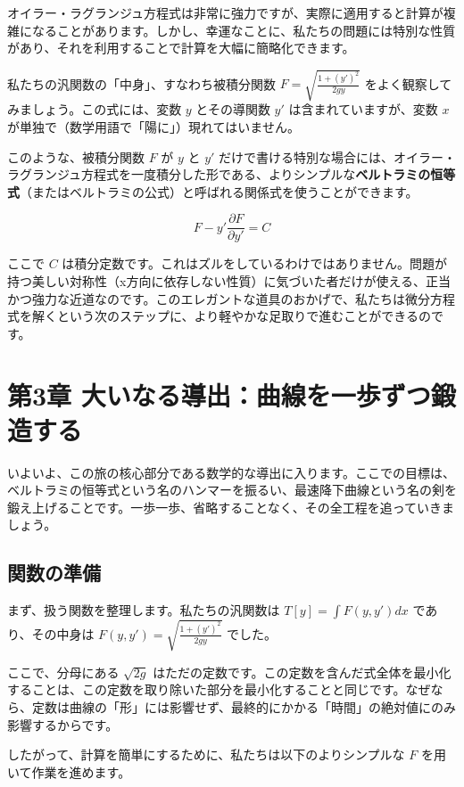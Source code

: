 \documentclass[12pt,a4paper]{ltjsarticle}
\begin{document}
オイラー・ラグランジュ方程式は非常に強力ですが、実際に適用すると計算が複雑になることがあります。しかし、幸運なことに、私たちの問題には特別な性質があり、それを利用することで計算を大幅に簡略化できます。

私たちの汎関数の「中身」、すなわち被積分関数 $F = \sqrt{\frac{1 + (y')^2}{2gy}}$ をよく観察してみましょう。この式には、変数 $y$ とその導関数 $y'$ は含まれていますが、変数 $x$ が単独で（数学用語で「陽に」）現れてはいません。

このような、被積分関数 $F$ が $y$ と $y'$ だけで書ける特別な場合には、オイラー・ラグランジュ方程式を一度積分した形である、よりシンプルな\textbf{ベルトラミの恒等式}（またはベルトラミの公式）と呼ばれる関係式を使うことができます。

\begin{equation}
F - y' \frac{\partial F}{\partial y'} = C
\end{equation}

ここで $C$ は積分定数です。これはズルをしているわけではありません。問題が持つ美しい対称性（x方向に依存しない性質）に気づいた者だけが使える、正当かつ強力な近道なのです。このエレガントな道具のおかげで、私たちは微分方程式を解くという次のステップに、より軽やかな足取りで進むことができるのです。

\section{第3章 大いなる導出：曲線を一歩ずつ鍛造する}

いよいよ、この旅の核心部分である数学的な導出に入ります。ここでの目標は、ベルトラミの恒等式という名のハンマーを振るい、最速降下曲線という名の剣を鍛え上げることです。一歩一歩、省略することなく、その全工程を追っていきましょう。

\subsection{関数の準備}

まず、扱う関数を整理します。私たちの汎関数は $T[y] = \int F(y, y') dx$ であり、その中身は $F(y, y') = \sqrt{\frac{1 + (y')^2}{2gy}}$ でした。

ここで、分母にある $\sqrt{2g}$ はただの定数です。この定数を含んだ式全体を最小化することは、この定数を取り除いた部分を最小化することと同じです。なぜなら、定数は曲線の「形」には影響せず、最終的にかかる「時間」の絶対値にのみ影響するからです。

したがって、計算を簡単にするために、私たちは以下のよりシンプルな $F$ を用いて作業を進めます。
\end{document}
